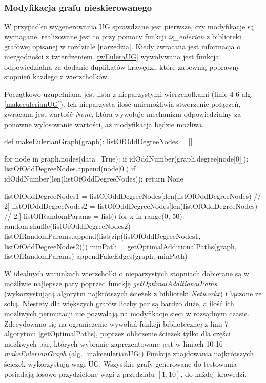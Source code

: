 \documentclass[a4paper, 12pt, twoside, openright]{article}
\begin{document}
\subsubsection{Modyfikacja grafu nieskierowanego} \label{mgnieskier}
	\indent\par	
	W przypadku wygenerowania UG sprawdzane jest pierwsze, czy modyfikacje są wymagane, realizowane jest to przy pomocy funkcji \textit{is\_eulerian} z biblioteki grafowej opisanej w rozdziale \ref{narzedzia}. Kiedy zwracana jest informacja o niezgodności z twierdzeniem \ref{twEuleraUG} wywoływana jest funkcja odpowiedzialna za dodanie duplikatów krawędzi, które zapewnią poprawny stopnień każdego z wierzchołków. 
	
	Początkowo uzupełniana jest lista z nieparzystymi wierzchołkami (linie 4-6 alg. \ref{makeeulerianUG}). Ich nieparzysta ilość uniemożliwia stworzenie połączeń, zwracana jest wartość \textit{None}, która wywołuje mechanizm odpowiedzialny za ponowne wylosowanie wartości, aż modyfikacja będzie możliwa.
	
\begin{algorithm}[caption={\textit{makeEulerianGraph} przekształcający graf nieskierowany do grafu Eulera}, label={makeeulerianUG}]
def makeEulerianGraph(graph):
	listOfOddDegreeNodes = []
	
	for node in graph.nodes(data=True):
		if idOddNumber(graph.degree[node[0]]):
			listOfOddDegreeNodes.append(node[0])
	if idOddNumber(len(listOfOddDegreeNodes)):
		return None
	
	listOfOddDegreeNodes1 = listOfOddDegreeNodes[:len(listOfOddDegreeNodes) // 2]
	listOfOddDegreeNodes2 = listOfOddDegreeNodes[len(listOfOddDegreeNodes) // 2:]
	listOfRandomParams = list()
	for x in range(0, 50):
		random.shuffle(listOfOddDegreeNodes2)
		listOfRandomParams.append(list(zip(listOfOddDegreeNodes1, 
							listOfOddDegreeNodes2)))
	minPath = getOptimalAdditionalPaths(graph, listOfRandomParams)
	appendFakeEdges(graph, minPath)
\end{algorithm}

	W idealnych warunkach wierzchołki o nieparzystych stopniach dobierane są w możliwie najlepsze pary poprzed funckję \textit{getOptimalAdditionalPaths} (wykorzystującą algorytm najkrótszych ścieżek z biblioteki \textit{Networkx}) i łączone ze sobą. Niestety dla większych grafów liczby par są bardzo duże, a ilość ich możliwych permutacji nie pozwalają na modyfikacje sieci w rozsądnym czasie. Zdecydowano się na ograniczenie wywołań funkcji bibliotecznej z linii 7 algorytmu \ref{getOptimalPaths}, poprzez obliczenie ścieżek tylko dla części możliwych par, których wybranie zaprezentowane jest w liniach 10-16 \textit{makeEulerianGraph} (alg. \ref{makeeulerianUG}) Funkcje znajdowania najkrótszych ścieżek wykorzystują wagi UG. Wszystkie grafy generowane do testowania posiadają losowo przydzielone wagi z przedziału $[1, 10]$, do każdej krawędzi.
\end{document}
